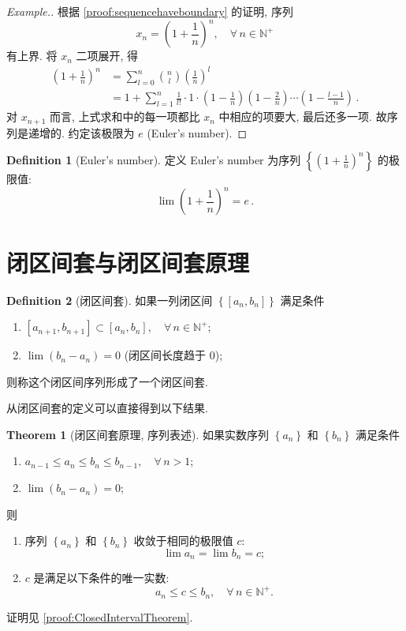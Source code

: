 \documentclass{book}
\newcommand{\Any}{\forall\,}
\newcommand{\set}[1]{\left\{#1\right\}}
\newcommand{\e}{e}%
\newcommand{\N}{\mathbb{N}}
\renewcommand{\le}{\leqslant}
\newenvironment{example}
{
  \renewcommand{\qedsymbol}{}
  \begin{proof}[Example.]
}
{\end{proof}}
\numberwithin{equation}{section}
\numberwithin{figure}{section}
\theoremstyle{definition}
\newtheorem{definition}{Definition}
\newtheorem{theorem}{Theorem}[section]
\begin{document}
\begin{example}
  根据 \cref{proof:sequencehaveboundary} 的证明, 序列
  \begin{equation*}
    x_n=\left( 1+\frac{1}{n} \right)^n,\quad\Any n\in\N^+
  \end{equation*}
  有上界. 将 $x_n$ 二项展开, 得
  \begin{align*}
    \left( 1+\frac{1}{n} \right)^n
    &=\sum_{l=0}^{n}\binom{n}{l}\left( \frac{1}{n} \right)^l\\
    &=1+\sum_{l=1}^{n}\frac{1}{l!}\cdot1\cdot\left( 1-\frac{1}{n} \right)\left( 1-\frac{2}{n} \right)\cdots\left( 1-\frac{l-1}{n} \right)\,.
  \end{align*}
  对 $x_{n+1}$ 而言, 上式求和中的每一项都比 $x_n$ 中相应的项要大, 最后还多一项. 故序列是递增的.
  约定该极限为 $\e$ (Euler's number).
\end{example}
\begin{definition}[Euler's number]
  定义 Euler's number 为序列 $\displaystyle\set{\left(1+\frac{1}{n} \right)^{n}}$ 的极限值:
  \begin{equation*}
    \lim\left( 1+\frac{1}{n} \right)^n=\e\,.
  \end{equation*}
\end{definition}

\section{闭区间套与闭区间套原理}
\begin{definition}[闭区间套]
  如果一列闭区间 $\set{[a_n,b_n]}$ 满足条件
  \begin{enumerate}
    \item $[a_{n+1},b_{n+1}]\subset[a_n,b_n],\quad\Any n\in\N^+$;
    \item $\lim(b_n-a_n)=0$ (闭区间长度趋于 $0$);
  \end{enumerate}
  则称这个闭区间序列形成了一个闭区间套.
\end{definition}

从闭区间套的定义可以直接得到以下结果.
\begin{theorem}[闭区间套原理, 序列表述]
  如果实数序列 $\set{a_n}$ 和 $\set{b_n}$ 满足条件
  \begin{enumerate}
    \item $a_{n-1}\le a_n\le b_n\le b_{n-1},\quad\Any n>1$;
    \item $\lim(b_n-a_n)=0$;
  \end{enumerate}
  则
  \begin{enumerate}
    \item 序列 $\set{a_n}$ 和 $\set{b_n}$ 收敛于相同的极限值 $c$:
      \begin{equation*}
	\lim a_n=\lim b_n=c;
      \end{equation*}
    \item $c$ 是满足以下条件的唯一实数:
      \begin{equation*}
	a_n\le c\le b_n,\quad\Any n\in\N^+.
      \end{equation*}
  \end{enumerate}
  \label{the:ClosedIntervalTheorem}
\end{theorem}
证明见 \cref{proof:ClosedIntervalTheorem}.
\end{document}
